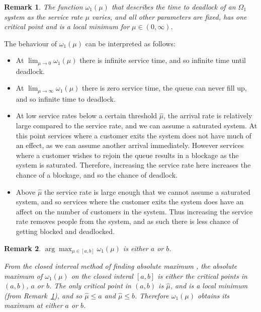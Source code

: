 \documentclass{article}
\newtheorem{remark}{Remark}
\numberwithin{equation}{section}
\begin{document}
\begin{remark}\label{rem:oneminima}
The function $\omega_1(\mu)$ that describes the time to deadlock of an $\Omega_1$ system as the service rate $\mu$ varies, and all other parameters are fixed, has one critical point and is a local minimum for $\mu \in (0, \infty)$.
\end{remark}

The behaviour of $\omega_1(\mu)$ can be interpreted as follows:
\begin{itemize}
\item At $\lim_{\mu \to 0} \omega_1 (\mu)$ there is infinite service time, and so infinite time until deadlock.
\item At $\lim_{\mu \to \infty} \omega_1 (\mu)$ there is zero service time, the queue can never fill up, and so infinite time to deadlock.
\item At low service rates below a certain threshold $\hat{\mu}$, the arrival rate is relatively large compared to the service rate, and we can assume a saturated system.
At this point services where a customer exits the system does not have much of an effect, as we can assume another arrival immediately.
However services where a customer wishes to rejoin the queue results in a blockage as the system is saturated.
Therefore, increasing the service rate here increases the chance of a blockage, and so the chance of deadlock.
\item Above $\hat{\mu}$ the service rate is large enough that we cannot assume a saturated system, and so services where the customer exits the system does have an affect on the number of customers in the system.
Thus increasing the service rate removes people from the system, and as such there is less chance of getting blocked and deadlocked.
\end{itemize}

\begin{remark}\label{rem:findmaximum}
$\arg\max_{\mu \in [a, b]} \omega_1(\mu)$ is either $a$ or $b$.

From the closed interval method of finding absolute maximum \cite{tan09}, the absolute maximum of $\omega_1(\mu)$ on the closed interal $[a, b]$ is either the critical points in $(a, b)$, $a$ or $b$.
The only critical point in $(a, b)$ is $\hat{\mu}$, and is a local minimum (from Remark~\ref{rem:oneminima}), and so $\hat{\mu} \leq a$ and $\hat{\mu} \leq b$.
Therefore $\omega_1(\mu)$ obtains its maximum at either $a$ or $b$.
\end{remark}
\end{document}
